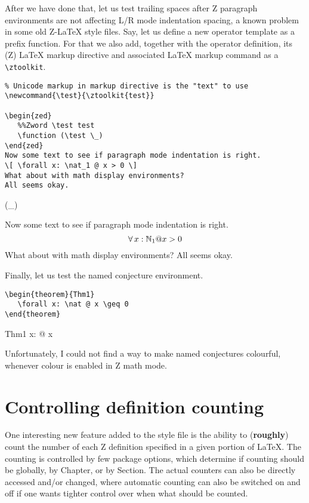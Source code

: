 \documentclass{article}
\def\gives{\endquote\endgroup\egroup}
\begin{document}
After we have done that, let us test trailing spaces after Z paragraph environments are not
affecting L/R mode indentation spacing, a known problem in some old Z-\LaTeX{} style files.
Say, let us define a new operator template as a prefix function. For that we also add,
together with the operator definition, its (Z) \LaTeX{} markup directive and associated
\LaTeX{} markup command as a \verb|\ztoolkit|.
%
\begin{demo}
\begin{verbatim}
% Unicode markup in markup directive is the "text" to use
\newcommand{\test}{\ztoolkit{test}}

\begin{zed}
   %%Zword \test test
   \function (\test \_)
\end{zed}
Now some text to see if paragraph mode indentation is right.
\[ \forall x: \nat_1 @ x > 0 \]
What about with math display environments?
All seems okay.
\end{verbatim}
\gives
\newcommand{\test}{}

\begin{zed}
   \function (\test \_)
\end{zed}
Now some text to see if paragraph mode indentation is right.
\[ \forall x: \nat_1 @ x > 0 \]
What about with math display environments? All seems okay.
\end{demo}
%
Finally, let us test the named conjecture environment.
%
\begin{demo}
\begin{verbatim}
\begin{theorem}{Thm1}
   \forall x: \nat @ x \geq 0
\end{theorem}
\end{verbatim}
\gives
\begin{theorem}{Thm1}
   \forall x: \nat @ x 
\end{theorem}
\end{demo}
%
Unfortunately, I could not find a way to make named conjectures
colourful, whenever colour is enabled in Z math mode.

\section{Controlling definition counting}\label{sec:cztcount}

One interesting new feature added to the style file is the ability 
to (\textbf{roughly}) count the number of each Z definition specified
in a given portion of \LaTeX. The counting is controlled by few
package options, which determine if counting should be globally,
by Chapter, or by Section. The actual counters can also be directly
accessed and/or changed, where automatic counting can also be switched
on and off if one wants tighter control over when what should be counted.
\end{document}
